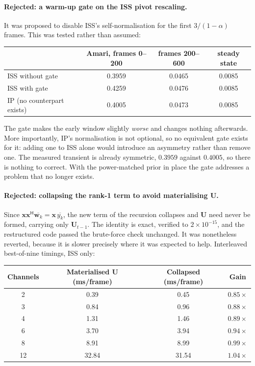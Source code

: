 \documentclass[11pt,a4paper]{article}
\newcommand{\U}{\boldsymbol{U}}
\newcommand{\x}{\boldsymbol{x}}
\newcommand{\w}{\boldsymbol{w}}
\newcommand{\herm}{^{\mathsf{H}}}
\begin{document}
\paragraph{Rejected: a warm-up gate on the ISS pivot rescaling.} It was proposed
to disable ISS's self-normalisation for the first $3/(1-\alpha)$ frames. This
was tested rather than assumed:

\begin{table}[h]
\centering
\begin{tabular}{lccc}
\toprule
& Amari, frames 0--200 & frames 200--600 & steady state \\
\midrule
ISS without gate & 0.3959 & 0.0465 & 0.0085 \\
ISS with gate & 0.4259 & 0.0476 & 0.0085 \\
IP (no counterpart exists) & 0.4005 & 0.0473 & 0.0085 \\
\bottomrule
\end{tabular}
\end{table}

The gate makes the early window slightly \emph{worse} and changes nothing
afterwards. More importantly, IP's normalisation is not optional, so no
equivalent gate exists for it: adding one to ISS alone would introduce an
asymmetry rather than remove one. The measured transient is already symmetric,
$0.3959$ against $0.4005$, so there is nothing to correct. With the
power-matched prior in place the gate addresses a problem that no longer exists.


\paragraph{Rejected: collapsing the rank-1 term to avoid materialising $\U$.}
Since $\x\x\herm\overline{\w_k} = \x\,\overline{y_k}$, the new term of the
recursion collapses and $\U$ need never be formed, carrying only $\U_{t-1}$.
The identity is exact, verified to $2\times10^{-15}$, and the restructured code
passed the brute-force check unchanged. It was nonetheless reverted, because it
is slower precisely where it was expected to help. Interleaved best-of-nine
timings, ISS only:

\begin{table}[h]
\centering
\begin{tabular}{cccc}
\toprule
Channels & Materialised $\U$ (ms/frame) & Collapsed (ms/frame) & Gain \\
\midrule
2 & 0.39 & 0.45 & $0.85\times$ \\
3 & 0.84 & 0.96 & $0.88\times$ \\
4 & 1.31 & 1.46 & $0.89\times$ \\
6 & 3.70 & 3.94 & $0.94\times$ \\
8 & 8.91 & 8.99 & $0.99\times$ \\
12 & 32.84 & 31.54 & $1.04\times$ \\
\bottomrule
\end{tabular}
\end{table}
\end{document}
